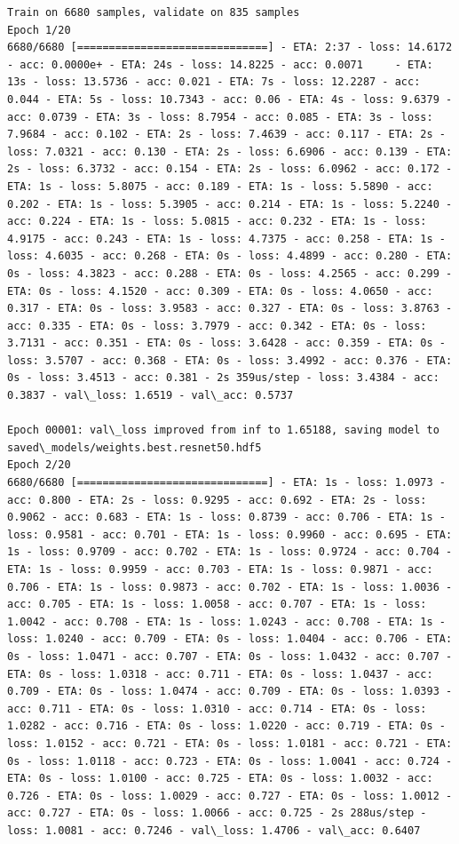 \documentclass[11pt]{article}
\begin{document}
    \begin{Verbatim}[commandchars=\\\{\}]
Train on 6680 samples, validate on 835 samples
Epoch 1/20
6680/6680 [==============================] - ETA: 2:37 - loss: 14.6172 - acc: 0.0000e+ - ETA: 24s - loss: 14.8225 - acc: 0.0071     - ETA: 13s - loss: 13.5736 - acc: 0.021 - ETA: 7s - loss: 12.2287 - acc: 0.044 - ETA: 5s - loss: 10.7343 - acc: 0.06 - ETA: 4s - loss: 9.6379 - acc: 0.0739 - ETA: 3s - loss: 8.7954 - acc: 0.085 - ETA: 3s - loss: 7.9684 - acc: 0.102 - ETA: 2s - loss: 7.4639 - acc: 0.117 - ETA: 2s - loss: 7.0321 - acc: 0.130 - ETA: 2s - loss: 6.6906 - acc: 0.139 - ETA: 2s - loss: 6.3732 - acc: 0.154 - ETA: 2s - loss: 6.0962 - acc: 0.172 - ETA: 1s - loss: 5.8075 - acc: 0.189 - ETA: 1s - loss: 5.5890 - acc: 0.202 - ETA: 1s - loss: 5.3905 - acc: 0.214 - ETA: 1s - loss: 5.2240 - acc: 0.224 - ETA: 1s - loss: 5.0815 - acc: 0.232 - ETA: 1s - loss: 4.9175 - acc: 0.243 - ETA: 1s - loss: 4.7375 - acc: 0.258 - ETA: 1s - loss: 4.6035 - acc: 0.268 - ETA: 0s - loss: 4.4899 - acc: 0.280 - ETA: 0s - loss: 4.3823 - acc: 0.288 - ETA: 0s - loss: 4.2565 - acc: 0.299 - ETA: 0s - loss: 4.1520 - acc: 0.309 - ETA: 0s - loss: 4.0650 - acc: 0.317 - ETA: 0s - loss: 3.9583 - acc: 0.327 - ETA: 0s - loss: 3.8763 - acc: 0.335 - ETA: 0s - loss: 3.7979 - acc: 0.342 - ETA: 0s - loss: 3.7131 - acc: 0.351 - ETA: 0s - loss: 3.6428 - acc: 0.359 - ETA: 0s - loss: 3.5707 - acc: 0.368 - ETA: 0s - loss: 3.4992 - acc: 0.376 - ETA: 0s - loss: 3.4513 - acc: 0.381 - 2s 359us/step - loss: 3.4384 - acc: 0.3837 - val\_loss: 1.6519 - val\_acc: 0.5737

Epoch 00001: val\_loss improved from inf to 1.65188, saving model to saved\_models/weights.best.resnet50.hdf5
Epoch 2/20
6680/6680 [==============================] - ETA: 1s - loss: 1.0973 - acc: 0.800 - ETA: 2s - loss: 0.9295 - acc: 0.692 - ETA: 2s - loss: 0.9062 - acc: 0.683 - ETA: 1s - loss: 0.8739 - acc: 0.706 - ETA: 1s - loss: 0.9581 - acc: 0.701 - ETA: 1s - loss: 0.9960 - acc: 0.695 - ETA: 1s - loss: 0.9709 - acc: 0.702 - ETA: 1s - loss: 0.9724 - acc: 0.704 - ETA: 1s - loss: 0.9959 - acc: 0.703 - ETA: 1s - loss: 0.9871 - acc: 0.706 - ETA: 1s - loss: 0.9873 - acc: 0.702 - ETA: 1s - loss: 1.0036 - acc: 0.705 - ETA: 1s - loss: 1.0058 - acc: 0.707 - ETA: 1s - loss: 1.0042 - acc: 0.708 - ETA: 1s - loss: 1.0243 - acc: 0.708 - ETA: 1s - loss: 1.0240 - acc: 0.709 - ETA: 0s - loss: 1.0404 - acc: 0.706 - ETA: 0s - loss: 1.0471 - acc: 0.707 - ETA: 0s - loss: 1.0432 - acc: 0.707 - ETA: 0s - loss: 1.0318 - acc: 0.711 - ETA: 0s - loss: 1.0437 - acc: 0.709 - ETA: 0s - loss: 1.0474 - acc: 0.709 - ETA: 0s - loss: 1.0393 - acc: 0.711 - ETA: 0s - loss: 1.0310 - acc: 0.714 - ETA: 0s - loss: 1.0282 - acc: 0.716 - ETA: 0s - loss: 1.0220 - acc: 0.719 - ETA: 0s - loss: 1.0152 - acc: 0.721 - ETA: 0s - loss: 1.0181 - acc: 0.721 - ETA: 0s - loss: 1.0118 - acc: 0.723 - ETA: 0s - loss: 1.0041 - acc: 0.724 - ETA: 0s - loss: 1.0100 - acc: 0.725 - ETA: 0s - loss: 1.0032 - acc: 0.726 - ETA: 0s - loss: 1.0029 - acc: 0.727 - ETA: 0s - loss: 1.0012 - acc: 0.727 - ETA: 0s - loss: 1.0066 - acc: 0.725 - 2s 288us/step - loss: 1.0081 - acc: 0.7246 - val\_loss: 1.4706 - val\_acc: 0.6407


\end{Verbatim}
\end{document}

